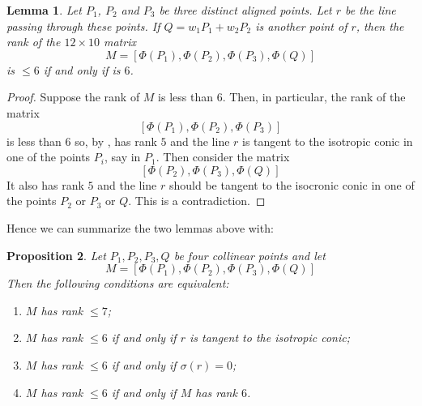\documentclass[12pt, a4paper, reqno, captions=tableheading,bibliography=totoc]{scrartcl}
\theoremstyle{plain}
\newtheorem{lemma}{Lemma}[section]
\newtheorem{prop}[lemma]{Proposition}
\theoremstyle{definition}
\begin{document}
\begin{lemma}
  Let $P_1$, $P_2$ and $P_3$ be three distinct aligned points.
  Let $r$ be the line passing through these points.
  If $Q = w_1P_1+w_2P_2$ is another point of $r$,
  then the rank of the $12\times 10$ matrix
\begin{equation}
M = \left[
\Phi(P_1), \Phi(P_2), \Phi(P_3), \Phi(Q)
\right]
\end{equation}
is $\leq 6$ if and only if is $6$.
\end{lemma}
\begin{proof}
  Suppose the rank of $M$ is less than $6$. Then, in particular,
  the rank of the matrix
  \[
    [\Phi(P_1), \Phi(P_2), \Phi(P_3)]
  \]
  is less than $6$ so, by , has rank $5$ and the
  line $r$ is tangent to the isotropic conic in one of the points
  $P_i$, say in $P_1$. Then consider the matrix
  \[
    [\Phi(P_2), \Phi(P_3), \Phi(Q)]
  \]
  It also has rank $5$ and the line $r$ should be tangent to the isocronic
  conic in one of the points $P_2$ or $P_3$ or $Q$. This is a contradiction.
\end{proof}

Hence we can summarize the two lemmas above with:
\begin{prop}
  \label{prop:rango67}
  Let $P_1, P_2, P_3, Q$ be four collinear points and let
  \[
  M = [\Phi(P_1), \Phi(P_2), \Phi(P_3), \Phi(Q)]
  \]
  Then the following conditions
  are equivalent:
  \begin{enumerate}
  \item $M$ has rank $\leq 7$;
  \item $M$ has rank $\leq 6$ if and only if $r$ is tangent to the
    isotropic conic;
  \item $M$ has rank $\leq 6$ if and only if $\sigma(r) = 0$;
  \item $M$ has rank $\leq 6$ if and only if $M$ has rank $6$.
  \end{enumerate}
\end{prop}
\end{document}
